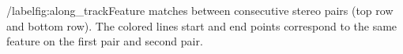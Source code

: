/label{fig:along_track}Feature matches between consecutive stereo pairs (top row and bottom row). The colored lines start and end points correspond to the same feature on the first pair and second pair. 
  